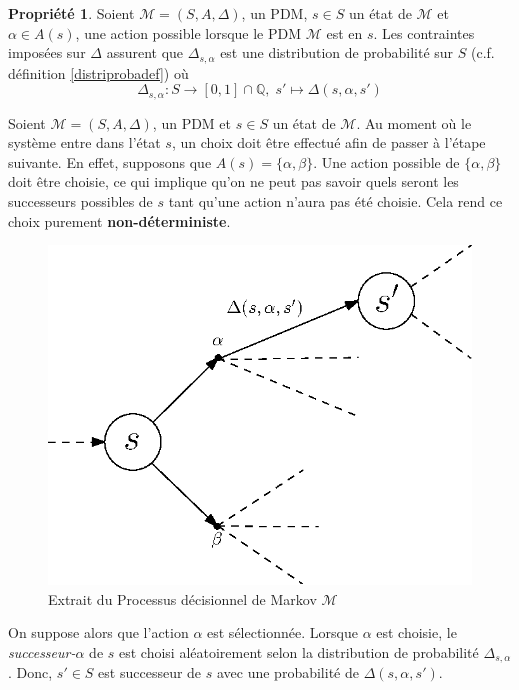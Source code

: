 \documentclass[12pt,a4paper]{report}
\theoremstyle{definition}%
\newtheorem{propriete}{Propriété}[chapter]
\theoremstyle{remark}
\newcommand{\cf}{c.f. }
\begin{document}
\begin{propriete}
	Soient $\mathcal{M} = (S, A, \Delta)$, un PDM, $s \in S$ un état de $\mathcal{M}$ et $\alpha \in A(s)$, une action possible lorsque le PDM $\mathcal{M}$ est en $s$. Les contraintes imposées sur $\Delta$ assurent que $\Delta_{s, \alpha}$ est une distribution de probabilité sur $S$ (\cf définition \ref{distriprobadef}) où
	\[
		\Delta_{s, \alpha} : S \rightarrow [0, 1] \cap \mathbb{Q}, \; s' \mapsto \Delta(s, \alpha, s')
	\]
\end{propriete}

Soient $\mathcal{M} = (S, A, \Delta)$, un PDM et $s \in S$ un état de $\mathcal{M}$. Au moment où le système entre dans l'état $s$, un choix doit être effectué afin de passer à l'étape suivante. En effet, supposons que $A(s) = \{\alpha, \beta\}$. Une action possible de $\{\alpha, \beta \}$ doit être choisie, ce qui implique qu'on ne
peut pas savoir quels seront les successeurs possibles de $s$ tant qu'une action
n'aura pas été choisie. Cela rend ce choix purement \textbf{non-déterministe}.
\begin{figure}[H]
	\centering
	\includegraphics[scale=0.7]{figures/PDM-intuition.eps}
	\caption{Extrait du Processus décisionnel de Markov $\mathcal{M}$}
\end{figure}
On suppose alors que l'action $\alpha$ est sélectionnée. Lorsque $\alpha$ est choisie, le \textit{successeur-}$\alpha$ de $s$ est choisi aléatoirement selon la distribution de probabilité $\Delta_{s, \alpha}$. Donc, $s' \in S$ est successeur de $s$ avec une probabilité de $\Delta(s, \alpha, s')$.
\end{document}
